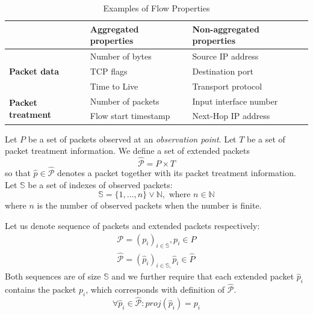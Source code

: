 \begin{table}[ht!]
	\centering
	\begin{tabular}{lll}
	\toprule
	                                           & \textbf{Aggregated properties}  & \textbf{Non-aggregated properties}  \\ \midrule
	\multirow{3}{*}{\textbf{Packet data}}      & Number of bytes                 & Source IP address                   \\ 
	                                           & TCP flags                       & Destination port                    \\ 
	                                           & Time to Live                    & Transport protocol                  \\ \midrule
	\multirow{2}{*}{\textbf{Packet treatment}} & Number of packets               & Input interface number              \\ 
	                                           & Flow start timestamp            & Next-Hop IP address                 \\ \bottomrule
	\end{tabular}
	\caption{Examples of Flow Properties}
	\label{tab:flow.properties}
\end{table}



Let $P$ be a set of packets observed at an \emph{observation point}. Let $T$ be a set of packet treatment information. We define a set of extended packets
\begin{equation*}
	\widehat{\mathcal{P}} = P\times T
\end{equation*}
so that $\widehat{p} \in \widehat{\mathcal{P}}$ denotes a packet together with its packet treatment information. Let $\mathbb{S}$ be a set of indexes of observed packets:
\begin{equation*}
	\mathbb{S} = \{1, \ldots, n\} \lor \mathbb{N}, \mbox{ where } n \in \mathbb{N}
\end{equation*}
where $n$ is the number of observed packets when the number is finite.

Let us denote sequence of packets and extended packets respectively:
\begin{align*}
	\mathcal{P} = (p_i)_{i \in \mathbb{S}}, p_i \in P\\
	\widehat{\mathcal{P}} = (\widehat{p}_i)_{i \in \mathbb{S},} \widehat{p}_i \in \widehat{P}
\end{align*}
Both sequences are of size $\mathbb{S}$ and we further require that each extended packet $\widehat{p}_i$ contains the packet $p_i$, which corresponds with definition of $\widehat{\mathcal{P}}$.
\begin{equation*}
	\forall \widehat{p}_i \in \widehat{\mathcal{P}}: proj(\widehat{p}_i) = p_i
\end{equation*}


